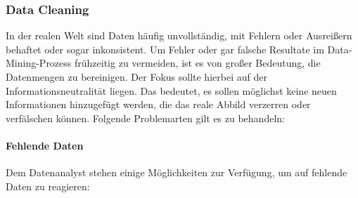 \subsubsection{Data Cleaning}
\label{dc}
In der realen Welt sind Daten häufig \glqq unvollständig, mit Fehlern oder Ausreißern behaftet oder sogar inkonsistent.\grqq{} Um Fehler oder gar falsche Resultate im Data-Mining-Prozess frühzeitig zu vermeiden, ist es von großer Bedeutung, die Datenmengen zu bereinigen. Der Fokus sollte hierbei auf der Informationsneutralität liegen. Das bedeutet, es sollen möglichst keine neuen Informationen hinzugefügt werden, die das reale Abbild verzerren oder verfälschen können. Folgende Problemarten gilt es zu behandeln:

\paragraph{Fehlende Daten} 
Dem Datenanalyst stehen einige Möglichkeiten zur Verfügung, um auf fehlende Daten zu reagieren:

